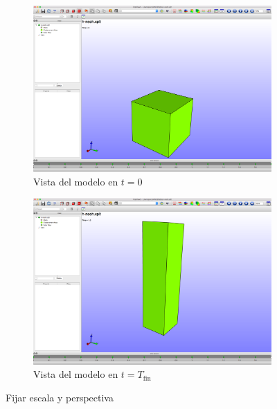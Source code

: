 \begin{figure}[!htp]
\centering
\begin{subfigure}[b]{0.48\textwidth}
\centering
\includegraphics[width=\textwidth]{figuras_3/scr-post-02.png}
\caption{Vista del modelo en $t=0$}
\label{fig:post-02}
\end{subfigure}
\begin{subfigure}[b]{0.48\textwidth}
\centering
\includegraphics[width=\textwidth]{figuras_3/scr-post-03.png}
\caption{Vista del modelo en $t=T_\text{fin}$}
\label{fig:post-03}
\end{subfigure}
\caption{Fijar escala y perspectiva}
\label{fig:post-02-03}
\end{figure}

